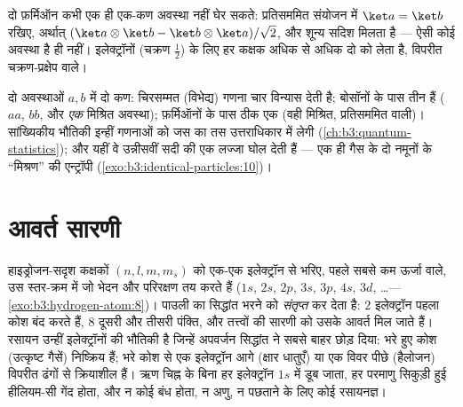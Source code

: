 \begin{corollary}[पाउली का अपवर्जन सिद्धांत]\label{cor:b3:identical-particles:pauli}
दो फ़र्मिऑन कभी एक ही एक-कण अवस्था नहीं घेर सकते: प्रतिसममित संयोजन में
$\ket a = \ket b$ रखिए, अर्थात्
$(\ket a\otimes\ket b - \ket b\otimes\ket a)/\sqrt2$, और शून्य सदिश
मिलता है --- ऐसी कोई अवस्था है ही नहीं। इलेक्ट्रॉनों (चक्रण $\tfrac12$)
के लिए हर कक्षक अधिक से अधिक दो को लेता है, विपरीत चक्रण-प्रक्षेप वाले।
\end{corollary}

\begin{example}\label{ex:b3:identical-particles:counting}
दो अवस्थाओं $a, b$ में दो कण: चिरसम्मत (विभेद्य) गणना चार विन्यास देती
है; बोसॉनों के पास तीन हैं ($aa$, $bb$, और \emph{एक} मिश्रित अवस्था);
फ़र्मिऑनों के पास ठीक एक (वही मिश्रित, प्रतिसममित वाली)। सांख्यिकीय
भौतिकी इन्हीं गणनाओं को जस का तस उत्तराधिकार में लेगी
(\cref{ch:b3:quantum-statistics}); और यहीं वे उन्नीसवीं सदी की एक
लज्जा घोल देती हैं --- एक ही गैस के दो नमूनों के ``मिश्रण'' की
एन्ट्रॉपी (\cref{exo:b3:identical-particles:10})।
\end{example}

\section{आवर्त सारणी}

\begin{proposition}[कोश, और रसायन क्यों है]\label{prop:b3:identical-particles:periodic}
हाइड्रोजन-सदृश कक्षकों $(n, l, m, m_s)$ को एक-एक इलेक्ट्रॉन से भरिए,
पहले सबसे कम ऊर्जा वाले, उस स्तर-क्रम में जो भेदन और परिरक्षण तय करते
हैं ($1s$, $2s$, $2p$, $3s$, $3p$, $4s$, $3d$, \dots ---
\cref{exo:b3:hydrogen-atom:8})। पाउली का सिद्धांत भरने को
\emph{संतृप्त} कर देता है: $2$ इलेक्ट्रॉन पहला कोश बंद करते हैं, $8$
दूसरी और तीसरी पंक्ति, और तत्त्वों की सारणी को उसके आवर्त मिल जाते
हैं। रसायन उन्हीं इलेक्ट्रॉनों की भौतिकी है जिन्हें अपवर्जन सिद्धांत ने
सबसे बाहर छोड़ दिया: भरे हुए कोश (उत्कृष्ट गैसें) निष्क्रिय हैं; भरे
कोश से एक इलेक्ट्रॉन आगे (क्षार धातुएँ) या एक विवर पीछे (हैलोजन)
विपरीत ढंगों से क्रियाशील हैं। ऋण चिह्न के बिना हर इलेक्ट्रॉन $1s$ में
डूब जाता, हर परमाणु सिकुड़ी हुई हीलियम-सी गेंद होता, और न कोई बंध
होता, न अणु, न पछताने के लिए कोई रसायनज्ञ।
\end{proposition}
\admitted

